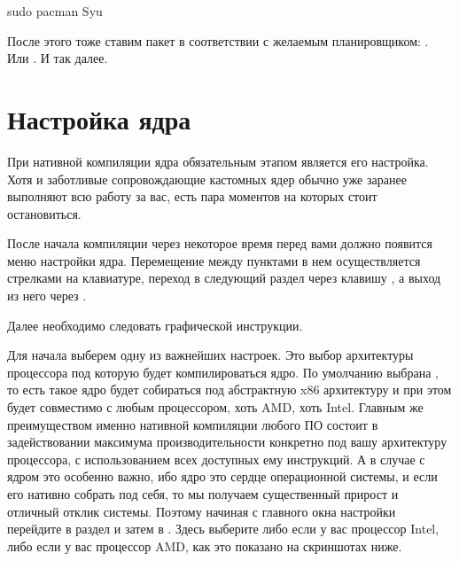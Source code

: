 \documentclass[letterpaper,10pt,russian,openany]{sphinxmanual}
\begin{document}
\begin{sphinxVerbatim}[commandchars=\\\{\}]
sudo pacman \PYGZhy{}Syu
\end{sphinxVerbatim}

\sphinxAtStartPar
После этого тоже ставим пакет в соответствии с желаемым планировщиком: .
Или . И так далее.

\ignorespaces 

\section{Настройка ядра}
\label{\detokenize{source/custom-kernels:manual-kernel-configuration}}\label{\detokenize{source/custom-kernels:index-6}}\label{\detokenize{source/custom-kernels:id8}}
\sphinxAtStartPar
При нативной компиляции ядра обязательным этапом является его настройка.
Хотя и заботливые сопровождающие кастомных ядер обычно уже заранее выполняют
всю работу за вас, есть пара моментов на которых стоит остановиться.

\sphinxAtStartPar
После начала компиляции через некоторое время перед вами должно появится меню настройки ядра.
Перемещение между пунктами в нем осуществляется стрелками на клавиатуре, переход в
следующий раздел через клавишу , а выход из него через .

\sphinxAtStartPar
Далее необходимо следовать графической инструкции.

\sphinxAtStartPar
{} Для начала выберем одну из важнейших настроек. Это выбор архитектуры процессора под которую будет компилироваться ядро.
По умолчанию выбрана , то есть такое ядро будет собираться под абстрактную x86 архитектуру и при этом будет совместимо
с любым процессором, хоть AMD, хоть Intel. Главным же преимуществом именно нативной компиляции любого ПО состоит в задействовании
максимума производительности конкретно под вашу архитектуру процессора, с использованием всех доступных ему инструкций. А в случае
с ядром это особенно важно, ибо ядро это сердце операционной системы, и если его нативно собрать под себя, то мы получаем существенный
прирост и отличный отклик системы. Поэтому начиная с главного окна настройки перейдите в раздел  и затем
в . Здесь выберите либо  если у вас процессор Intel, либо  если
у вас процессор AMD, как это показано на скриншотах ниже.
\end{document}
